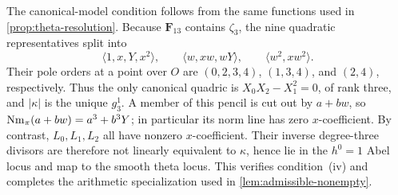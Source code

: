 The canonical-model condition follows from the same functions used in
\cref{prop:theta-resolution}.  Because $\mathbf F_{13}$ contains $\zeta_3$,
the nine quadratic
representatives split into
\[
 \langle1,x,Y,x^2\rangle,\qquad
 \langle w,xw,wY\rangle,\qquad
 \langle w^2,xw^2\rangle.
\]
Their pole orders at a point over $O$ are $(0,2,3,4)$, $(1,3,4)$, and
$(2,4)$, respectively.  Thus the only canonical quadric is
$X_0X_2-X_1^2=0$, of rank three, and $|\kappa|$ is the unique $g^1_3$.
A member of this pencil is cut out by $a+bw$, so
$\operatorname{Nm}_\pi(a+bw)=a^3+b^3Y$; in particular its norm line has zero
$x$-coefficient.  By contrast, $L_0,L_1,L_2$ all have nonzero
$x$-coefficient.  Their inverse degree-three
divisors are therefore not linearly equivalent to $\kappa$, hence lie in the
$h^0=1$ Abel locus and map to the smooth theta locus.  This verifies
condition~(iv) and completes the arithmetic specialization used in
\cref{lem:admissible-nonempty}.

